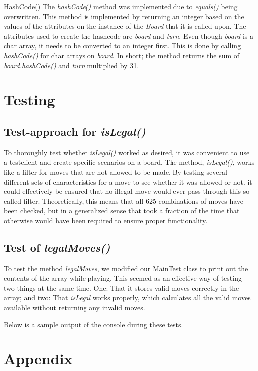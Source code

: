 \documentclass[12pt, a4paper]{article}
\begin{document}
HashCode()
The \emph{hashCode()} method was implemented due to \emph{equals()} being overwritten. This method is implemented by returning an integer based on the values of the attributes on the instance of the \emph{Board} that it is called upon. The attributes used to create the hashcode are \emph{board} and \emph{turn}. Even though \emph{board} is a char array, it needs to be converted to an integer first. This is done by calling \emph{hashCode()} for char arrays on \emph{board}. In short; the method returns the sum of \emph{board.hashCode()} and \emph{turn} multiplied by 31.
	
\section{Testing}

\subsection{Test-approach for \emph{isLegal()}}
To thoroughly test whether \emph{isLegal()} worked as desired, it was convenient to use a testclient and create specific scenarios on a board. The method, \emph{isLegal()}, works like a filter for moves that are not allowed to be made. By testing several different sets of characteristics for a move to see whether it was allowed or not, it could effectively be ensured that no illegal move would ever pass through this so-called filter. Theoretically, this means that all 625 combinations of moves have been checked, but in a generalized sense that took a fraction of the time that otherwise would have been required to ensure proper functionality.

\subsection{Test of \emph{legalMoves()}}
To test the method \emph{legalMoves}, we modified our MainTest class to print out the contents of the array while playing. This seemed as an effective way of testing two things at the same time. One: That it stores valid moves correctly in the array; and two: That \emph{isLegal} works properly, which calculates all the valid moves available without returning any invalid moves. \par
Below is a sample output of the console during these tests.


\newpage

\section{Appendix}
\end{document}
